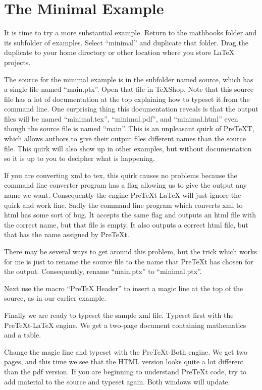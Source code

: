 \documentclass[11pt, oneside]{article}   	%
\begin{document}
\section{The Minimal Example}

It is time to try a more substantial example. Return to the mathbooks folder and its subfolder of examples. Select ``minimal'' and duplicate that folder. Drag the duplicate to your home directory or other location where you store LaTeX projects.

The source for the minimal example is in the subfolder named source, which has a single file named ``main.ptx''. Open that file in TeXShop. Note that this source file has a lot of documentation at the top explaining how to typeset it from the command line. One surprising thing this documentation reveals is that the output files will be named ``minimal.tex'', ``minimal.pdf'', and ``minimal.html''
even though the source file is named ``main''. This is an unpleasant quirk of PreTeXT, which allows authors to give their output files different names than the source file. This quirk will also show up in other examples, but without documentation so it is up to you to decipher what is happening.

If you are converting xml to tex, this quirk causes no problems because the command line converter program has a flag allowing us to give the output any name we want. Consequently the engine PreTeXt-LaTeX will just ignore the quirk and work fine. Sadly the command line program which converts xml to html has some sort of bug. It accepts the same flag and outputs an html file with the correct name, but that file is empty. It also outputs a correct html file, but that has the name assigned by PreTeXt.

There may be several ways to get around this problem, but the trick which works for me is just to rename the source file to the name that PreTeXt has chosen for the output. Consequently, rename ``main.ptx'' to ``minimal.ptx''.

Next use the macro ``PreTeX Header'' to insert a magic line at the top of the source, as in our earlier example.

Finally we are ready to typeset the sample xml file. Typeset first with the PreTeXt-LaTeX engine. We get a two-page document containing mathematics and a table.

Change the magic line and typeset with the PreTeXt-Both engine.  We get two pages, and this time we see that the HTML version looks quite a lot different than the pdf version. If you are beginning to understand PreTeXt code, try to add material to the source and typeset again. Both windows will update.
\end{document}

